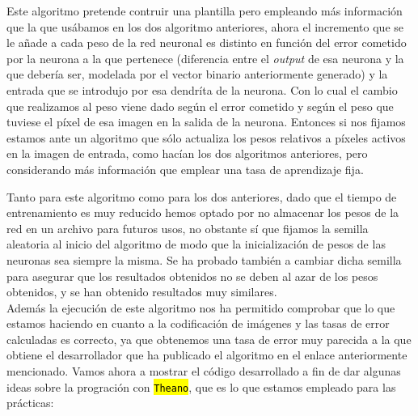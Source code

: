 \documentclass[10pt,a4paper]{article}
\newcommand{\code}[1]{\sethlcolor{light-gray}\hl{\texttt{#1}}} %
\begin{document}
Este algoritmo pretende contruir una plantilla pero empleando más información que la que usábamos en los dos algoritmo anteriores, ahora el incremento que se le añade a cada peso de la red neuronal es distinto en función del error cometido por la neurona a la que pertenece (diferencia entre el \textit{output} de esa neurona y la que debería ser, modelada por el vector binario anteriormente generado) y la entrada que se introdujo por esa dendríta de la neurona. Con lo cual el cambio que realizamos al peso viene dado según el error cometido y según el peso que tuviese el píxel de esa imagen en la salida de la neurona. Entonces si nos fijamos estamos ante un algoritmo que sólo actualiza los pesos relativos a píxeles activos en la imagen de entrada, como hacían los dos algoritmos anteriores, pero considerando más información que emplear una tasa de aprendizaje fija.

Tanto para este algoritmo como para los dos anteriores, dado que el tiempo de entrenamiento es muy reducido hemos optado por no almacenar los pesos de la red en un archivo para futuros usos, no obstante sí que fijamos la semilla aleatoria al inicio del algoritmo de modo que la inicialización de pesos de las neuronas sea siempre la misma. Se ha probado también a cambiar dicha semilla para asegurar que los resultados obtenidos no se deben al azar de los pesos obtenidos, y se han obtenido resultados muy similares.\\

Además la ejecución de este algoritmo nos ha permitido comprobar que lo que estamos haciendo en cuanto a la codificación de imágenes y las tasas de error calculadas es correcto, ya que obtenemos una tasa de error muy parecida a la que obtiene el desarrollador que ha publicado el algoritmo en el enlace anteriormente mencionado. Vamos ahora a mostrar el código desarrollado a fin de dar algunas ideas sobre la progración con \code{Theano}, que es lo que estamos empleado para las prácticas:\\
\end{document}
